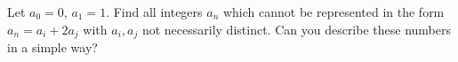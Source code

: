 Let $a_0 = 0$, $a_1 = 1$. Find all integers $a_n$ which cannot be represented in the form $a_n = a_i + 2a_j$ with $a_i, a_j$ not necessarily distinct. Can you describe these numbers in a simple way?
